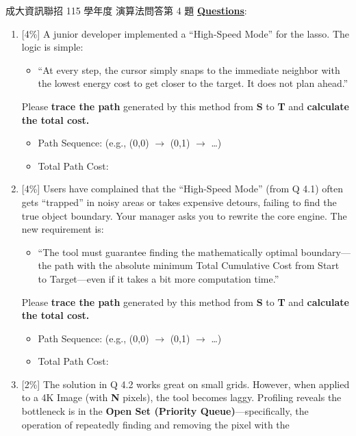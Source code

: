 \begin{pastexam}[label={px:ncku-115-prog-17}]{成大資訊聯招 115 學年度 演算法問答第 4 題}
\underline{\textbf{Questions}}:
\begin{enumerate}[label=(\arabic*)]
\item {[4\%]} A junior developer implemented a ``High-Speed Mode'' for the lasso. The logic is simple:
\begin{itemize}[label=$\triangleright$]
\item ``At every step, the cursor simply snaps to the immediate neighbor with the lowest energy cost to
get closer to the target. It does not plan ahead.''
\end{itemize}
Please \textbf{trace the path} generated by this method from \textbf{S} to \textbf{T} and
\textbf{calculate the total cost.}
\begin{itemize}
\item Path Sequence: \underline{\hspace{4.5cm}} (e.g., (0,0) $\to$ (0,1) $\to$ \dots)
\item Total Path Cost: \underline{\hspace{4.5cm}}
\end{itemize}
\item {[4\%]} Users have complained that the ``High-Speed Mode'' (from Q 4.1) often gets ``trapped'' in
noisy areas or takes expensive detours, failing to find the true object boundary. Your manager asks you
to rewrite the core engine. The new requirement is:
\begin{itemize}[label=$\triangleright$]
\item ``The tool must guarantee finding the mathematically optimal boundary---the path with the absolute
minimum Total Cumulative Cost from Start to Target---even if it takes a bit more computation time.''
\end{itemize}
Please \textbf{trace the path} generated by this method from \textbf{S} to \textbf{T} and
\textbf{calculate the total cost.}
\begin{itemize}
\item Path Sequence: \underline{\hspace{4.5cm}} (e.g., (0,0) $\to$ (0,1) $\to$ \dots)
\item Total Path Cost: \underline{\hspace{4.5cm}}
\end{itemize}
\item {[2\%]} The solution in Q 4.2 works great on small grids. However, when applied to a 4K Image (with
\textbf{N} pixels), the tool becomes laggy. Profiling reveals the bottleneck is in the \textbf{Open Set
(Priority Queue)}---specifically, the operation of repeatedly finding and removing the pixel with the

\end{enumerate}
\end{pastexam}
